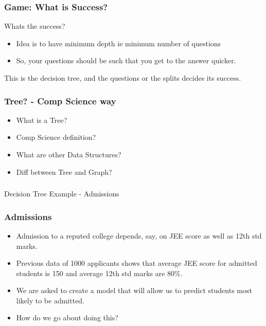 \begin{frame}[fragile]\frametitle{Game: What is Success?}
Whats the success?
\begin{itemize}
	\item Idea is to have minimum depth ie minimum number of questions
	\item So, your questions should be such that you get to the answer quicker.
	\end{itemize}
This is the decision tree, and the questions or the splits decides its success.
\end{frame}

\begin{frame}[fragile]\frametitle{Tree? - Comp Science way}
\begin{itemize}
	\item What is a Tree?
	\item Comp Science definition?
	\item What are other Data Structures?
	\item Diff between Tree and Graph?
	\end{itemize}
\end{frame}

\begin{frame}[fragile]\frametitle{}
\begin{center}
{\Large Decision Tree Example - Admissions}
\end{center}
\end{frame}

\begin{frame}[fragile]\frametitle{Admissions}
\begin{itemize}
	\item Admission to a reputed college depends, say, on JEE score as well as 12th std marks.
	\item Previous data of 1000 applicants shows that average JEE score for admitted students is 150 and average 12th std marks are 80\%. 
	\item We are asked to create a model that will allow us to predict students most likely to be admitted. 
	\item How do we go about doing this?
	\end{itemize}
\end{frame}

